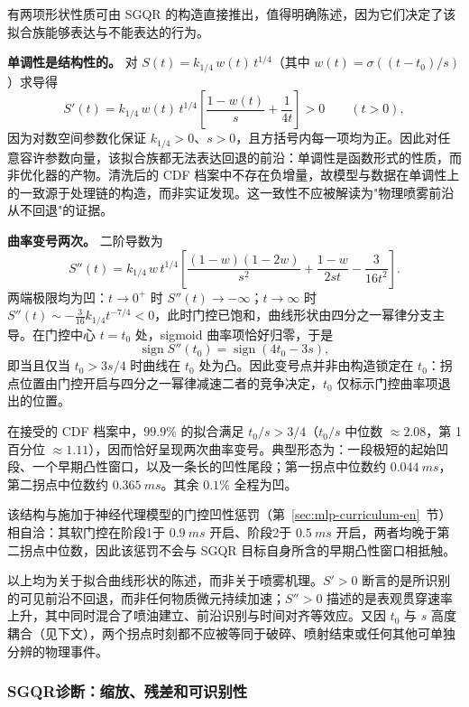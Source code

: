 有两项形状性质可由 SGQR 的构造直接推出，值得明确陈述，因为它们决定了该拟合族能够表达与不能表达的行为。

\textbf{单调性是结构性的。} 对 \(S(t)=k_{1/4}\,w(t)\,t^{1/4}\)（其中 \(w(t)=\sigma((t-t_0)/s)\)）求导得
\[
  S'(t)=k_{1/4}\,w(t)\,t^{1/4}\left[\frac{1-w(t)}{s}+\frac{1}{4t}\right]>0
  \qquad (t>0),
\]
因为对数空间参数化保证 \(k_{1/4}>0\)、\(s>0\)，且方括号内每一项均为正。因此对任意容许参数向量，该拟合族都无法表达回退的前沿：单调性是函数形式的性质，而非优化器的产物。清洗后的 CDF 档案中不存在负增量，故模型与数据在单调性上的一致源于处理链的构造，而非实证发现。这一致性不应被解读为"物理喷雾前沿从不回退"的证据。

\textbf{曲率变号两次。} 二阶导数为
\[
  S''(t)=k_{1/4}\,w\,t^{1/4}
  \left[\frac{(1-w)(1-2w)}{s^{2}}
        +\frac{1-w}{2st}
        -\frac{3}{16t^{2}}\right].
\]
两端极限均为凹：\(t\to 0^{+}\) 时 \(S''(t)\to-\infty\)；\(t\to\infty\) 时 \(S''(t)\sim-\tfrac{3}{16}k_{1/4}t^{-7/4}<0\)，此时门控已饱和，曲线形状由四分之一幂律分支主导。在门控中心 \(t=t_0\) 处，sigmoid 曲率项恰好归零，于是
\[
  \operatorname{sign}S''(t_0)=\operatorname{sign}\!\left(4t_0-3s\right),
\]
即当且仅当 \(t_0>3s/4\) 时曲线在 \(t_0\) 处为凸。因此变号点并非由构造锁定在 \(t_0\)：拐点位置由门控开启与四分之一幂律减速二者的竞争决定，\(t_0\) 仅标示门控曲率项退出的位置。

在接受的 CDF 档案中，\(99.9\%\) 的拟合满足 \(t_0/s>3/4\)（\(t_0/s\) 中位数 \(\approx2.08\)，第 1 百分位 \(\approx1.11\)），因而恰好呈现两次曲率变号。典型形态为：一段极短的起始凹段、一个早期凸性窗口，以及一条长的凹性尾段；第一拐点中位数约 \(\SI{0.044}{ms}\)，第二拐点中位数约 \(\SI{0.365}{ms}\)。其余 \(0.1\%\) 全程为凹。

该结构与施加于神经代理模型的门控凹性惩罚（第~\ref{sec:mlp-curriculum-en}~节）相自洽：其软门控在阶段1于 \(\SI{0.9}{ms}\) 开启、阶段2于 \(\SI{0.5}{ms}\) 开启，两者均晚于第二拐点中位数，因此该惩罚不会与 SGQR 目标自身所含的早期凸性窗口相抵触。

以上均为关于拟合曲线形状的陈述，而非关于喷雾机理。\(S'>0\) 断言的是所识别的可见前沿不回退，而非任何物质微元持续加速；\(S''>0\) 描述的是表观贯穿速率上升，其中同时混合了喷油建立、前沿识别与时间对齐等效应。又因 \(t_0\) 与 \(s\) 高度耦合（见下文），两个拐点时刻都不应被等同于破碎、喷射结束或任何其他可单独分辨的物理事件。

\subsubsection{SGQR诊断：缩放、残差和可识别性}

